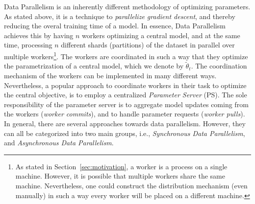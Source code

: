 Data Parallelism is an inherently different methodology of optimizing parameters. As stated above, it is a technique to \emph{parallelize gradient descent}, and thereby reducing the overal training time of a model. In essence, Data Parallelism achieves this by having $n$ workers optimizing a central model, and at the same time, processing $n$ different shards (partitions) of the dataset in parallel over multiple workers\footnote{As stated in Section~\ref{sec:motivation}, a worker is a process on a single machine. However, it is possible that multiple workers share the same machine. Nevertheless, one could construct the distribution mechanism (even manually) in such a way every worker will be placed on a different machine.}. The workers are coordinated in such a way that they optimize the parametrization of a central model, which we denote by $\tilde{\theta}_t$. The coordination mechanism of the workers can be implemented in many different ways. Nevertheless, a popular approach to coordinate workers in their task to optimize the central objective, is to employ a centralized \emph{Parameter Server} (PS). The sole responsibility of the parameter server is to aggregate model updates coming from the workers (\emph{worker commits}), and to handle parameter requests (\emph{worker pulls}). In general, there are several approaches towards data parallelism. However, they can all be categorized into two main groups, i.e., \emph{Synchronous Data Parallelism}, and \emph{Asynchronous Data Parallelism}.\\

